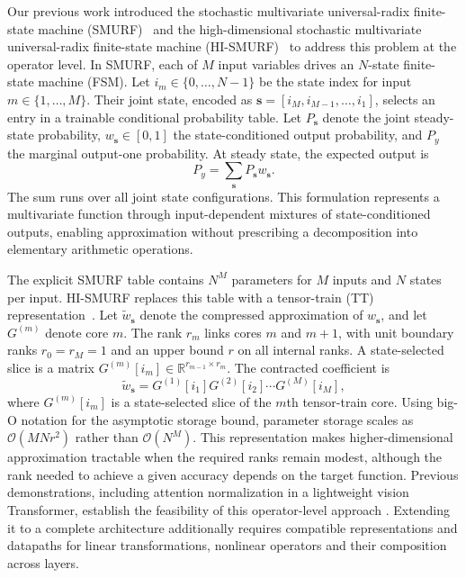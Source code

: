 \documentclass[pdflatex,sn-mathphys-num]{sn-jnl}
\theoremstyle{thmstyleone}
\theoremstyle{thmstyletwo}
\theoremstyle{thmstylethree}
\begin{document}
Our previous work introduced the stochastic multivariate universal-radix finite-state machine (SMURF)~\cite{feng2025smurf} and the high-dimensional stochastic multivariate universal-radix finite-state machine (HI-SMURF)~\cite{feng2026smurf} to address this problem at the operator level. In SMURF, each of $M$ input variables drives an $N$-state finite-state machine (FSM). Let $i_m\in\{0,\ldots,N-1\}$ be the state index for input $m\in\{1,\ldots,M\}$. Their joint state, encoded as $\boldsymbol{s}=[i_M,i_{M-1},\ldots,i_1]$, selects an entry in a trainable conditional probability table. Let $P_{\boldsymbol{s}}$ denote the joint steady-state probability, $w_{\boldsymbol{s}}\in[0,1]$ the state-conditioned output probability, and $P_y$ the marginal output-one probability. At steady state, the expected output is
\begin{equation}
P_y = \sum_{\boldsymbol{s}} P_{\boldsymbol{s}}w_{\boldsymbol{s}}. \label{eq:smurf_output}
\end{equation}
The sum runs over all joint state configurations. This formulation represents a multivariate function through input-dependent mixtures of state-conditioned outputs, enabling approximation without prescribing a decomposition into elementary arithmetic operations.

The explicit SMURF table contains $N^M$ parameters for $M$ inputs and $N$ states per input. HI-SMURF replaces this table with a tensor-train (TT) representation~\cite{oseledets2011tensor,feng2026smurf}. Let $\widetilde{w}_{\boldsymbol{s}}$ denote the compressed approximation of $w_{\boldsymbol{s}}$, and let $G^{(m)}$ denote core $m$. The rank $r_m$ links cores $m$ and $m+1$, with unit boundary ranks $r_0=r_M=1$ and an upper bound $r$ on all internal ranks. A state-selected slice is a matrix $G^{(m)}[i_m]\in\mathbb{R}^{r_{m-1}\times r_m}$. The contracted coefficient is
\begin{equation}
\widetilde{w}_{\boldsymbol{s}} = G^{(1)}[i_1] G^{(2)}[i_2] \cdots G^{(M)}[i_M], \label{eq:tt_parameterization}
\end{equation}
where $G^{(m)}[i_m]$ is a state-selected slice of the $m$th tensor-train core. Using big-O notation for the asymptotic storage bound, parameter storage scales as $\mathcal{O}(MNr^2)$ rather than $\mathcal{O}(N^M)$. This representation makes higher-dimensional approximation tractable when the required ranks remain modest, although the rank needed to achieve a given accuracy depends on the target function. Previous demonstrations, including attention normalization in a lightweight vision Transformer, establish the feasibility of this operator-level approach \cite{feng2026smurf}. Extending it to a complete architecture additionally requires compatible representations and datapaths for linear transformations, nonlinear operators and their composition across layers.
\end{document}
